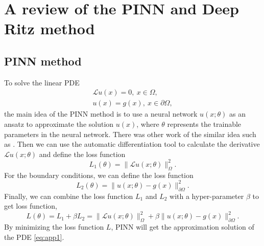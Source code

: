 \documentclass[hyperref]{article}
\numberwithin{equation}{section}
\theoremstyle{nonumberplain}
\begin{document}
	\section{A review of the PINN and Deep Ritz method}
	\label{ap1}
	\subsection{PINN method}
	To solve the linear PDE
	\begin{equation}
		\begin{aligned}
			\mathcal{L}u(x)=0, \ x\in\Omega,\\
			u(x) = g(x), \ x\in\partial\Omega,
		\end{aligned}
		\label{eq:app1}
	\end{equation}
	the main idea of the PINN\cite{raissi2019physics} method is to use a neural network $u(x;\theta)$ as an ansatz to approximate the solution $u(x)$, where $\theta$ represents the trainable parameters in the neural network. There was other work of the similar idea such as \cite{berg2018unified,lagaris2000neural,sirignano2018dgm}. Then we can use the automatic differentiation tool to calculate the derivative $\mathcal{L}u(x;\theta)$ and define the loss function 
	$$L_1(\theta) = \|\mathcal{L}u(x;\theta)\|^2_{\Omega}.$$ For the boundary conditions, we can define the loss function 
	$$L_2(\theta)=\|u(x;\theta)-g(x)\|^2_{\partial\Omega}.$$
	Finally, we can combine the loss function $L_1$ and $L_2$ with a hyper-parameter $\beta$ to get loss function,
	$$
	L(\theta) = L_1+\beta L_2 = \|\mathcal{L}u(x;\theta)\|^2_{\Omega}+\beta\|u(x;\theta)-g(x)\|^2_{\partial\Omega}.
	$$
	By minimizing the loss function $L$, PINN will get the approximation solution of the PDE \eqref{eq:app1}.
	
\end{document}
